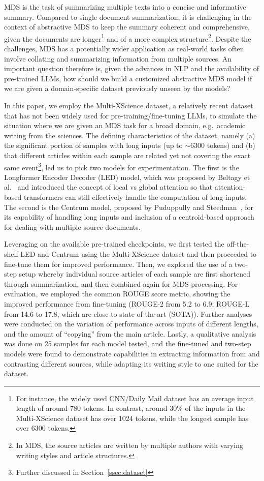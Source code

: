 \documentclass[12pt, twocolumn]{article}
\numberwithin{equation}{section}
\begin{document}
MDS is the task of summarizing multiple texts into a concise and informative summary. Compared to single document summarization, it is challenging in the context of abstractive MDS to keep the summary coherent and comprehensive, given the documents are longer\footnote{For instance, the widely used CNN/Daily Mail dataset has an average input length of around 780 tokens.  In contrast, around 30\% of the inputs in the Multi-XScience dataset has over 1024 tokens, while the longest sample has over 6300 tokens.} and of a more complex structure\footnote{In MDS, the source articles are written by multiple authors with varying writing styles and article structures.}. Despite the challenges, MDS has a potentially wider application as real-world tasks often involve collating and summarizing information from multiple sources.  An important question therefore is, given the advances in NLP and the availability of pre-trained LLMs, how should we build a customized abstractive MDS model if we are given a domain-specific dataset previously unseen by the models?  

In this paper, we employ the Multi-XScience dataset, a relatively recent dataset that has not been widely used for pre-training/fine-tuning LLMs, to simulate the situation where we are given an MDS task for a broad domain, e.g.~academic writing from the sciences.  The defining characteristics of the dataset, namely (a) the significant portion of samples with long inputs (up to $\sim$6300 tokens) and (b) that different articles within each sample are related yet not covering the exact same event\footnote{Further discussed in Section~\ref{ssec:dataset}}, led us to pick two models for experimentation.  The first is the Longformer Encoder Decoder (LED) model, which was proposed by Beltagy et al.~\cite{beltagy2020longformer} and introduced the concept of local vs global attention so that attention-based transformers can still effectively handle the computation of long inputs.   The second is the Centrum model, proposed by Puduppully and Steedman~\cite{puduppully2022multidocument}, for its capability of handling long inputs and inclusion of a centroid-based approach for dealing with multiple source documents. 

Leveraging on the available pre-trained checkpoints, we first tested the off-the-shelf LED and Centrum using the Multi-XScience dataset and then proceeded to fine-tune them for improved performance.  Then, we explored the use of a two-step setup whereby individual source articles of each sample are first shortened through summarization, and then combined again for MDS processing.  For evaluation, we employed the common ROUGE score metric, showing the improved performance from fine-tuning (ROUGE-2 from 5.2 to 6.9; ROUGE-L from 14.6 to 17.8, which are close to state-of-the-art (SOTA)).  Further analyses were conducted on the variation of performance across inputs of different lengths, and the amount of ``copying'' from the main article.  Lastly, a qualitative analysis was done on 25 samples for each model tested, and the fine-tuned and two-step models were found to demonstrate capabilities in extracting information from and contrasting different sources, while adapting its writing style to one suited for the dataset.
\end{document}
